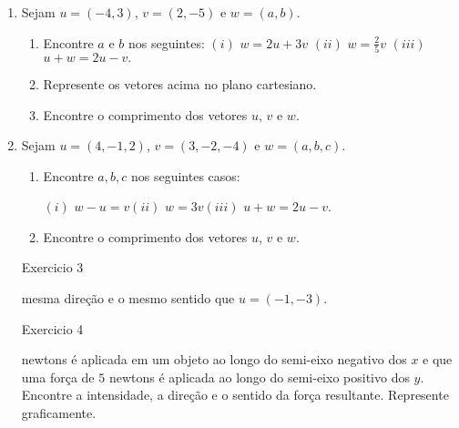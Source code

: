 \documentclass{report}
\begin{document}
\begin{Exercise}
\begin{enumerate}


\item \label{1lista3} Sejam $u=(-4,3)$, $v=(2,-5)$ e $w=(a,b)$.
\begin{enumerate}
    \item Encontre $a$ e $b$ nos seguintes:
    $(i)$ $w=2u+3v$ \qquad $(ii)$ $w=\frac{2}{5}v$ \qquad $(iii)$
    $u+w=2u-v.$
    \item Represente os vetores acima no plano cartesiano.
    \item Encontre o comprimento dos vetores $u$, $v$ e $w$.
\end{enumerate}


\item \label{2lista3} Sejam $u=\left( 4,-1,2\right) $, $v=\left( 3,-2,-4\right) $ e $%
w=(a,b,c)$.
\begin{enumerate}
    \item Encontre $a,b,c$ nos seguintes casos:

    $(i)$ $w-u=v$\qquad $(ii)$ $w=3v$\qquad $(iii)$ $u+w=2u-v.$
    \item  Encontre o comprimento dos vetores $u$, $v$ e $w$.
\end{enumerate}

Exercicio 3

mesma dire\c{c}\~{a}o e o mesmo sentido que $u=(-1,-3).$


Exercicio 4

newtons \'{e} aplicada em um objeto ao longo do semi-eixo negativo
dos $x$ e que uma for\c{c}a de $5$ newtons \'{e} aplicada ao longo
do semi-eixo positivo dos $y$. Encontre a intensidade, a
dire\c{c}\~{a}o e o sentido da for\c{c}a resultante. Represente
graficamente.


\end{enumerate}
\end{Exercise}
\end{document}
